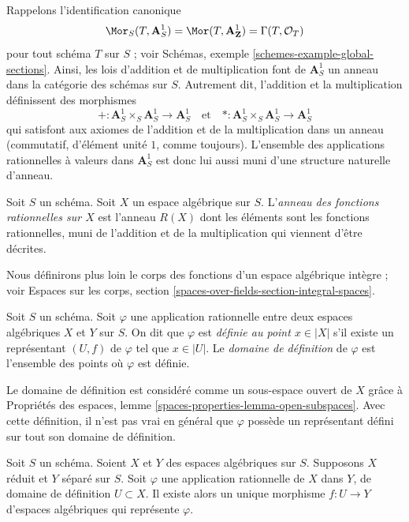 \medskip\noindent
Rappelons l'identification canonique
$$
\Mor_S(T, \mathbf{A}^1_S) = \Mor(T, \mathbf{A}^1_\mathbf{Z}) =
\Gamma(T, \mathcal{O}_T)
$$
pour tout schéma $T$ sur $S$ ; voir
Schémas, exemple \ref{schemes-example-global-sections}.
Ainsi, les lois d'addition et de multiplication font de $\mathbf{A}^1_S$ un anneau dans la
catégorie des schémas sur $S$. Autrement dit, l'addition
et la multiplication définissent des morphismes
$$
+ : \mathbf{A}^1_S \times_S \mathbf{A}^1_S \to \mathbf{A}^1_S
\quad\text{et}\quad
* : \mathbf{A}^1_S \times_S \mathbf{A}^1_S \to \mathbf{A}^1_S
$$
qui satisfont aux axiomes de l'addition et de la multiplication dans un anneau
(commutatif, d'élément unité $1$, comme toujours). L'ensemble des applications rationnelles
à valeurs dans $\mathbf{A}^1_S$ est donc lui aussi muni d'une structure naturelle d'anneau.

\begin{definition}
\label{definition-ring-of-rational-functions}
Soit $S$ un schéma.
Soit $X$ un espace algébrique sur $S$.
L'{\it anneau des fonctions rationnelles sur $X$}
est l'anneau $R(X)$ dont les éléments sont les fonctions rationnelles, muni de
l'addition et de la multiplication qui viennent d'être décrites.
\end{definition}

\noindent
Nous définirons plus loin le corps des fonctions d'un espace algébrique intègre ; voir
Espaces sur les corps, section \ref{spaces-over-fields-section-integral-spaces}.

\begin{definition}
\label{definition-domain-of-definition}
Soit $S$ un schéma. Soit $\varphi$ une application rationnelle entre deux
espaces algébriques $X$ et $Y$ sur $S$. On dit que
$\varphi$ est {\it définie au point $x \in |X|$} s'il existe un
représentant $(U, f)$ de $\varphi$ tel que $x \in |U|$. Le
{\it domaine de définition} de $\varphi$ est l'ensemble des points où
$\varphi$ est définie.
\end{definition}

\noindent
Le domaine de définition est considéré comme un sous-espace ouvert de $X$ grâce à
Propriétés des espaces, lemme \ref{spaces-properties-lemma-open-subspaces}.
Avec cette définition, il n'est pas vrai en général que $\varphi$ possède un
représentant défini sur tout son domaine de définition.

\begin{lemma}
\label{lemma-rational-map-from-reduced-to-separated}
Soit $S$ un schéma. Soient $X$ et $Y$ des espaces algébriques sur $S$.
Supposons $X$ réduit et $Y$ séparé sur $S$. Soit
$\varphi$ une application rationnelle de $X$ dans $Y$, de domaine de définition
$U \subset X$. Il existe alors un unique morphisme $f : U \to Y$
d'espaces algébriques qui représente $\varphi$.
\end{lemma}

